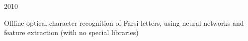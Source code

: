 \begin{cvprojects}
  \cvproject
    {} %
    {} %
    {} %
    {2010} %
    {
      \begin{cvitems} %
        \item {Offline optical character recognition of Farsi letters, using neural networks and feature extraction (with no special libraries)}
      \end{cvitems}
    }

\end{cvprojects}